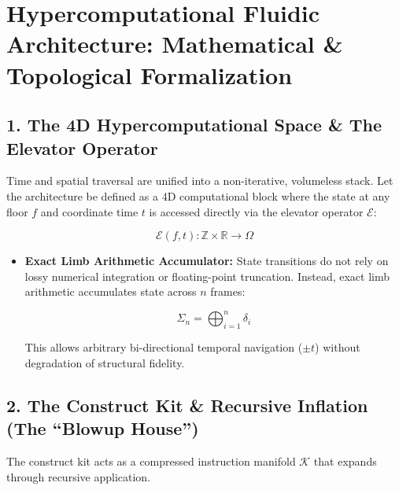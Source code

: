 \chapter{\texorpdfstring{Hypercomputational Fluidic Architecture: Mathematical \& Topological Formalization}{Hypercomputational Fluidic Architecture: Mathematical \& Topological Formalization}}
\label{chap:fluidic-2-elevator-identity-entropy}

\section{\texorpdfstring{1. The 4D Hypercomputational Space \& The Elevator Operator}{1. The 4D Hypercomputational Space \& The Elevator Operator}}

Time and spatial traversal are unified into a non-iterative, volumeless stack. Let the architecture be defined as a 4D computational block where the state at any floor \(f\) and coordinate time \(t\) is accessed directly via the elevator operator \(\mathcal{E}\):

\[
\mathcal{E}(f, t) : \mathbb{Z} \times \mathbb{R} \to \Omega
\]

\begin{itemize}
\item \textbf{Exact Limb Arithmetic Accumulator:} State transitions do not rely on lossy numerical integration or floating-point truncation. Instead, exact limb arithmetic accumulates state across \(n\) frames:

\[
\Sigma_n = \bigoplus_{i=1}^{n} \delta_i
\]

This allows arbitrary bi-directional temporal navigation (\(\pm t\)) without degradation of structural fidelity.
\end{itemize}

\medskip

\section{\texorpdfstring{2. The Construct Kit \& Recursive Inflation (The “Blowup House”)}{2. The Construct Kit \& Recursive Inflation (The "Blowup House")}}

The construct kit acts as a compressed instruction manifold \(\mathcal{K}\) that expands through recursive application.

